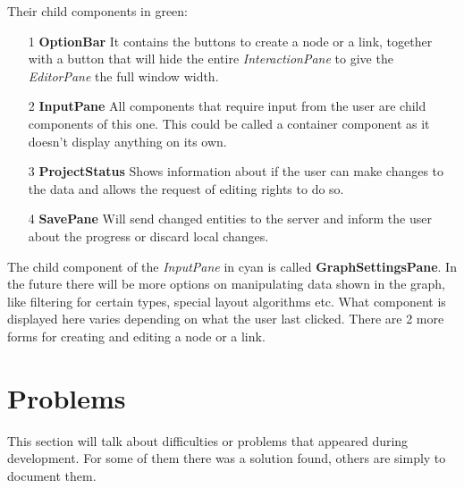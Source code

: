 Their child components in green:
\begin{itemize}
\item[1] \textbf{OptionBar} It contains the buttons to create a node or a link, together with a button that will hide the entire \emph{InteractionPane} to give the \emph{EditorPane} the full window width.
\item[2] \textbf{InputPane} All components that require input from the user are child components of this one. This could be called a container component as it doesn't display anything on its own.
\item[3] \textbf{ProjectStatus} Shows information about if the user can make changes to the data and allows the request of editing rights to do so.
\item[4] \textbf{SavePane} Will send changed entities to the server and inform the user about the progress or discard local changes.
\end{itemize}

The child component of the \emph{InputPane} in cyan is called \textbf{GraphSettingsPane}. In the future there will be more options on manipulating data shown in the graph, like filtering for certain types, special layout algorithms etc. What component is displayed here varies depending on what the user last clicked. There are 2 more forms for creating and editing a node or a link.

\section{Problems}
This section will talk about difficulties or problems that appeared during development. For some of them there was a solution found, others are simply to document them.

